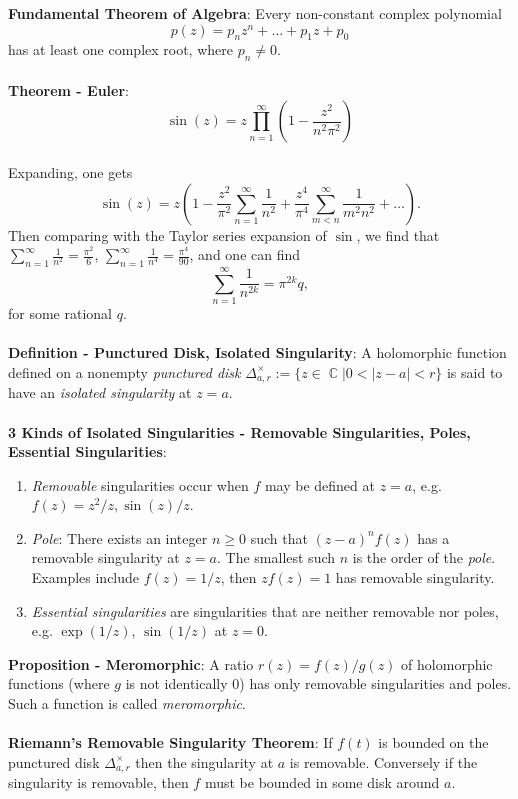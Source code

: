 \documentclass{article}
\DeclareMathOperator{\C}{\mathbb{C}}
\begin{document}
\textbf{Fundamental Theorem of Algebra}: Every non-constant complex polynomial $$p(z) = p_nz^n + \dots + p_1z + p_0$$ has at least one complex root, where $p_n \neq 0$. \\ \\
\textbf{Theorem - Euler}: $$\sin(z) = z \prod_{n = 1}^\infty \left( 1 - \frac{z^2}{n^2 \pi^2} \right)$$ \\
Expanding, one gets $$\sin(z) = z \left( 1 - \frac{z^2}{\pi^2} \sum_{n = 1}^\infty \frac{1}{n^2} + \frac{z^4}{\pi^4} \sum_{m < n}^\infty \frac{1}{m^2n^2} + \dots \right).$$ Then comparing with the Taylor series expansion of $\sin$, we find that $\sum_{n = 1}^\infty \frac{1}{n^2} = \frac{\pi^2}{6}$, $\sum_{n = 1}^\infty \frac{1}{n^4} = \frac{\pi^4}{90}$, and one can find $$\sum_{n = 1}^\infty \frac{1}{n^{2k}} = \pi^{2k} q,$$ for some rational $q$. \\ \\
\textbf{Definition - Punctured Disk, Isolated Singularity}:  A holomorphic function defined on a nonempty \textit{punctured disk} $\Delta_{a, r}^\times := \{z \in \C| 0 < |z - a| < r\}$ is said to have an \textit{isolated singularity} at $z = a$. \\ \\
\textbf{3 Kinds of Isolated Singularities - Removable Singularities, Poles, Essential Singularities}: \begin{enumerate}
    \item \textit{Removable} singularities occur when $f$ may be defined at $z = a$, e.g. $f(z) = z^2/z, \sin(z)/z$.
    \item \textit{Pole}: There exists an integer $n \geq 0$ such that $(z - a)^nf(z)$ has a removable singularity at $z = a$. The smallest such $n$ is the order of the \textit{pole}. Examples include $f(z) = 1/z$, then $zf(z) = 1$ has removable singularity.
    \item \textit{Essential singularities} are singularities that are neither removable nor poles, e.g. $\exp(1/z)$, $\sin(1/z)$ at $z = 0$.
\end{enumerate} $ $ \\
\textbf{Proposition - Meromorphic}: A ratio $r(z) = f(z)/g(z)$ of holomorphic functions (where $g$ is not identically 0) has only removable singularities and poles. Such a function is called \textit{meromorphic}. \\ \\
\textbf{Riemann's Removable Singularity Theorem}: If $f(t)$ is bounded on the punctured disk $\Delta_{a, r}^\times$ then the singularity at $a$ is removable. Conversely if the singularity is removable, then $f$ must be bounded in some disk around $a$. \\ \\
\end{document}
